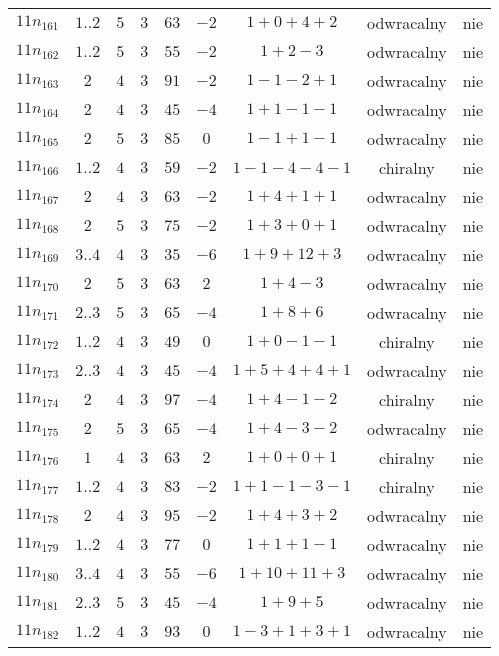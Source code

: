 \begin{longtable}{ccccccccc}
$11n_{161}$ & $1..2$ & $5$ & $3$ & $63$ & $-2$ & $1+0+4+2$ & odwracalny & nie \\
$11n_{162}$ & $1..2$ & $5$ & $3$ & $55$ & $-2$ & $1+2-3$ & odwracalny & nie \\
$11n_{163}$ & $2$ & $4$ & $3$ & $91$ & $-2$ & $1-1-2+1$ & odwracalny & nie \\
$11n_{164}$ & $2$ & $4$ & $3$ & $45$ & $-4$ & $1+1-1-1$ & odwracalny & nie \\
$11n_{165}$ & $2$ & $5$ & $3$ & $85$ & $0$ & $1-1+1-1$ & odwracalny & nie \\
$11n_{166}$ & $1..2$ & $4$ & $3$ & $59$ & $-2$ & $1-1-4-4-1$ & chiralny & nie \\
$11n_{167}$ & $2$ & $4$ & $3$ & $63$ & $-2$ & $1+4+1+1$ & odwracalny & nie \\
$11n_{168}$ & $2$ & $5$ & $3$ & $75$ & $-2$ & $1+3+0+1$ & odwracalny & nie \\
$11n_{169}$ & $3..4$ & $4$ & $3$ & $35$ & $-6$ & $1+9+12+3$ & odwracalny & nie \\
$11n_{170}$ & $2$ & $5$ & $3$ & $63$ & $2$ & $1+4-3$ & odwracalny & nie \\
$11n_{171}$ & $2..3$ & $5$ & $3$ & $65$ & $-4$ & $1+8+6$ & odwracalny & nie \\
$11n_{172}$ & $1..2$ & $4$ & $3$ & $49$ & $0$ & $1+0-1-1$ & chiralny & nie \\
$11n_{173}$ & $2..3$ & $4$ & $3$ & $45$ & $-4$ & $1+5+4+4+1$ & odwracalny & nie \\
$11n_{174}$ & $2$ & $4$ & $3$ & $97$ & $-4$ & $1+4-1-2$ & chiralny & nie \\
$11n_{175}$ & $2$ & $5$ & $3$ & $65$ & $-4$ & $1+4-3-2$ & odwracalny & nie \\
$11n_{176}$ & $1$ & $4$ & $3$ & $63$ & $2$ & $1+0+0+1$ & chiralny & nie \\
$11n_{177}$ & $1..2$ & $4$ & $3$ & $83$ & $-2$ & $1+1-1-3-1$ & chiralny & nie \\
$11n_{178}$ & $2$ & $4$ & $3$ & $95$ & $-2$ & $1+4+3+2$ & odwracalny & nie \\
$11n_{179}$ & $1..2$ & $4$ & $3$ & $77$ & $0$ & $1+1+1-1$ & odwracalny & nie \\
$11n_{180}$ & $3..4$ & $4$ & $3$ & $55$ & $-6$ & $1+10+11+3$ & odwracalny & nie \\
$11n_{181}$ & $2..3$ & $5$ & $3$ & $45$ & $-4$ & $1+9+5$ & odwracalny & nie \\
$11n_{182}$ & $1..2$ & $4$ & $3$ & $93$ & $0$ & $1-3+1+3+1$ & odwracalny & nie \\

\end{longtable}
